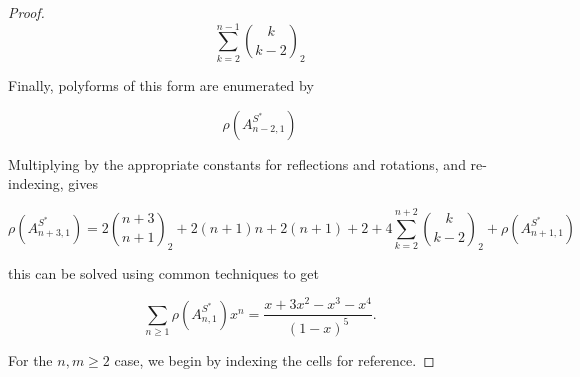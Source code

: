 \documentclass[12pt]{article}
\theoremstyle{plain}
\theoremstyle{definition}
\theoremstyle{remark}
\theoremstyle{definition}
\newcommand{\cellw}[4]{\draw[thick] ( #1 , #2 ) rectangle ( #3 , #4 );}
\newcommand{\cellb}[4]{\filldraw[black!60] ( #1 , #2 ) rectangle ( #3 , #4 ); \draw[thick] ( #1 , #2 ) rectangle ( #3 , #4 );}
\begin{document}
\begin{proof}
$$ \sum_{k=2}^{n-1}\binom{k}{k-2}_2 $$

Finally, polyforms of this form are enumerated by 

\begin{center}
\end{center}

$$\rho(A^{S^*}_{n-2,1})$$

Multiplying by the appropriate constants for reflections and rotations, and re-indexing, gives

\begin{equation*}
    \rho(A^{S^*}_{n+3,1}) = 2\binom{n+3}{n+1}_2 + 2(n+1)n + 2(n+1) + 2 + 4\sum_{k=2}^{n+2}\binom{k}{k-2}_2 + \rho(A^{S^*}_{n+1,1})
\end{equation*}

this can be solved using common techniques to get

\begin{equation*}
    \sum_{n \geq 1} \rho(A^{S^*}_{n,1}) x^n = \frac{x+3x^2-x^3-x^4}{(1-x)^5}.
\end{equation*}

For the $n,m \geq 2$ case, we begin by indexing the cells for reference. 
    

\end{proof}
\end{document}
